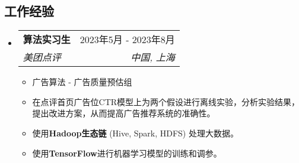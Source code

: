 \documentclass[letterpaper,11pt]{article}
\makeatletter
\newcommand{\resumeItem}[1]{
  \item\small{
    {#1 \vspace{-2pt}}
  }
}
\newcommand{\resumeSubheading}[4]{
  \vspace{-2pt}\item
  \begin{tabular*}{0.97\textwidth}[t]{l@{\extracolsep{\fill}}r}
    \textbf{#1} & #2 \\
    \textit{\small#3} & \textit{\small #4} \\
  \end{tabular*}\vspace{-7pt}
}
\newcommand{\resumeSubSubheading}[2]{
  \item
  \begin{tabular*}{0.97\textwidth}{l@{\extracolsep{\fill}}r}
    \textit{\small#1} & \textit{\small #2} \\
  \end{tabular*}\vspace{-7pt}
}
\newcommand{\resumeSubHeadingListStart}{\begin{itemize}[leftmargin=0.15in, label={}]}
\newcommand{\resumeSubHeadingListEnd}{\end{itemize}}
\newcommand{\resumeItemListStart}{\begin{itemize}}
\newcommand{\resumeItemListEnd}{\end{itemize}\vspace{-5pt}}
\makeatother
\begin{document}
\begin{CJK*}{UTF8}{gbsn}




  \section{工作经验}
  \resumeSubHeadingListStart

  \resumeSubheading
  {算法实习生}{2023年5月 - 2023年8月}
  {美团点评}{中国, 上海}
  \resumeItemListStart
  \resumeItem{广告算法 - 广告质量预估组}
  \resumeItem{
    在点评首页广告位CTR模型上为两个假设进行离线实验，分析实验结果，提出改进方案，从而提高广告推荐系统的准确性。
  }
  \resumeItem{
    使用\textbf{Hadoop生态链} (Hive, Spark, HDFS) 处理大数据。}
  \resumeItem{
    使用\textbf{TensorFlow}进行机器学习模型的训练和调参。}
  \resumeItemListEnd
  \resumeSubHeadingListEnd


\end{CJK*}
\end{document}
